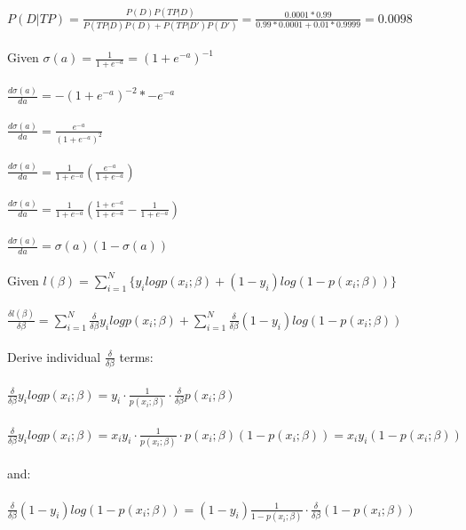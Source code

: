 \documentclass[12pt]{report}
\begin{document}
\\\\
$P(D|TP) = \frac{P(D)P(TP|D)}{P(TP|D)P(D)+P(TP|D')P(D')} = \frac{0.0001*0.99}{0.99*0.0001+0.01*0.9999} = 0.0098$
\newpage
{}
\\\\
Given $\sigma(a) = \frac{1}{1+e^{-a}} = (1+e^{-a})^{-1}$
\\\\
$\frac{d\sigma(a)}{da} = -(1+e^{-a})^{-2}*-e^{-a}$
\\\\
$\frac{d\sigma(a)}{da} = \frac{e^{-a}}{(1+e^{-a})^2}$
\\\\
$\frac{d\sigma(a)}{da} = \frac{1}{1+e^{-a}}\left(\frac{e^{-a}}{1+e^{-a}}\right)$
\\\\
$\frac{d\sigma(a)}{da} = \frac{1}{1+e^{-a}}\left(\frac{1+e^{-a}}{1+e^{-a}} - \frac{1}{1+e^{-a}}\right)$
\\\\
$\frac{d\sigma(a)}{da} = \sigma(a)\left(1-\sigma(a)\right)$
\newpage
{}
\\\\
Given $l(\beta)=\sum_{i=1}^N\{y_ilogp(x_i;\beta)+(1-y_i)log(1-p(x_i;\beta))\}$
\\\\
$\frac{\delta l(\beta)}{\delta\beta}=\sum_{i=1}^N\frac{\delta}{\delta\beta}y_ilogp(x_i;\beta)+\sum_{i=1}^N\frac{\delta}{\delta\beta}(1-y_i)log(1-p(x_i;\beta))$
\\\\
Derive individual $\frac{\delta}{\delta\beta}$ terms:
\\\\
$\frac{\delta}{\delta\beta}y_ilogp(x_i;\beta)=y_i\cdot\frac{1}{p(x_i;\beta)}\cdot\frac{\delta}{\delta\beta}p(x_i;\beta)$
\\\\
$\frac{\delta}{\delta\beta}y_ilogp(x_i;\beta)=x_iy_i\cdot\frac{1}{p(x_i;\beta)}\cdot p(x_i;\beta)(1-p(x_i;\beta))=x_iy_i(1-p(x_i;\beta))$
\\\\
and:
\\\\
$\frac{\delta}{\delta\beta}(1-y_i)log(1-p(x_i;\beta))=(1-y_i)\frac{1}{1-p(x_i;\beta)}\cdot\frac{\delta}{\delta\beta}(1-p(x_i;\beta))$
\\\\
\end{document}
